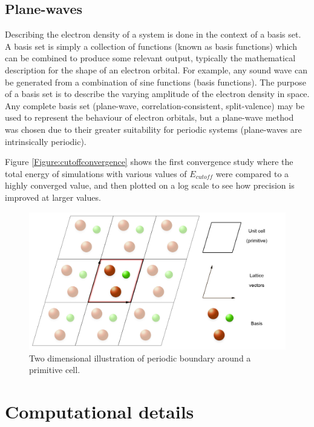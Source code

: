 \subsection{Plane-waves}

Describing the electron density of a system is done in the context of a basis set. A basis set is simply a collection of functions (known as basis functions) which can be combined to produce some relevant output, typically the mathematical description for the shape of an electron orbital. For example, any sound wave can be generated from a combination of sine functions (basis functions). The purpose of a basis set is to describe the varying amplitude of the electron density in space. Any complete basis set (plane-wave, correlation-consistent, split-valence) may be used to represent the behaviour of electron orbitals, but a plane-wave method was chosen due to their greater suitability for periodic systems (plane-waves are intrinsically periodic). 

Figure \ref{Figure:cutoffconvergence} shows the first convergence study where the total energy of simulations with various values of $E_{cutoff}$ were compared to a highly converged value, and then plotted on a log scale to see how precision is improved at larger values.

\begin{figure} %
\label{figure:periodicboundary}
\begin{center}
\includegraphics[width=\linewidth]{images/PeriodicBoundaryThesis.png}
\end{center}
\caption{Two dimensional illustration of periodic boundary around a primitive cell.}
\end{figure}


\section{Computational details}
